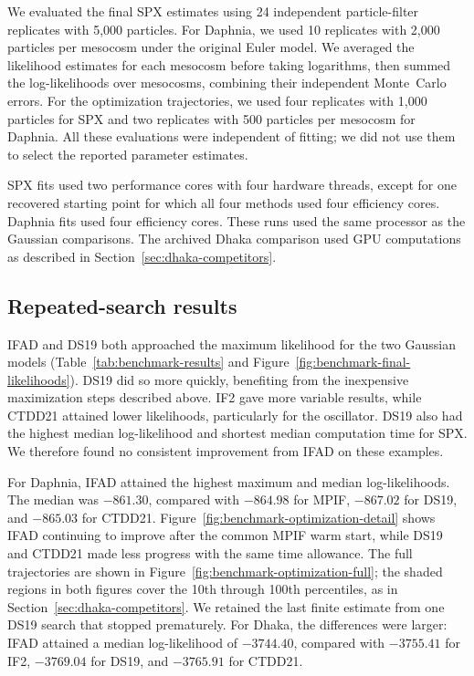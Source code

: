 \documentclass[11pt]{article}
\theoremstyle{thmstylethree}%
\begin{document}
We evaluated the final SPX estimates using 24 independent particle-filter
replicates with 5,000 particles. For Daphnia, we used 10 replicates with
2,000 particles per mesocosm under the original Euler model.
We averaged the likelihood estimates for each mesocosm before taking
logarithms, then summed the log-likelihoods over mesocosms, combining
their independent Monte~Carlo errors.
For the optimization trajectories, we used four replicates with 1,000
particles for SPX and two replicates with 500 particles per mesocosm
for Daphnia. All these evaluations were independent of fitting;
we did not use them to select the reported parameter estimates.

SPX fits used two performance cores with four hardware threads, except
for one recovered starting point for which all four methods used four
efficiency cores. Daphnia fits used four efficiency cores.
These runs used the same processor as the Gaussian comparisons.
The archived Dhaka comparison used GPU computations as described in
Section~\ref{sec:dhaka-competitors}.

\subsection{Repeated-search results}

IFAD and DS19 both approached the maximum likelihood for the two
Gaussian models (Table~\ref{tab:benchmark-results} and
Figure~\ref{fig:benchmark-final-likelihoods}). DS19 did so more quickly,
benefiting from the inexpensive maximization steps described above.
IF2 gave more variable results, while CTDD21 attained lower likelihoods,
particularly for the oscillator. DS19 also had the highest median
log-likelihood and shortest median computation time for SPX.
We therefore found no consistent improvement from IFAD on these examples.

For Daphnia, IFAD attained the highest maximum and median log-likelihoods.
The median was $-861.30$, compared with $-864.98$ for MPIF, $-867.02$
for DS19, and $-865.03$ for CTDD21.
Figure~\ref{fig:benchmark-optimization-detail} shows IFAD continuing to
improve after the common MPIF warm start, while DS19 and CTDD21 made
less progress with the same time allowance.
The full trajectories are shown in Figure~\ref{fig:benchmark-optimization-full};
the shaded regions in both figures cover the 10th through 100th
percentiles, as in Section~\ref{sec:dhaka-competitors}.
We retained the last finite estimate from one DS19 search that stopped
prematurely. For Dhaka, the differences were larger: IFAD attained a
median log-likelihood of $-3744.40$, compared with $-3755.41$ for IF2,
$-3769.04$ for DS19, and $-3765.91$ for CTDD21.
\end{document}
